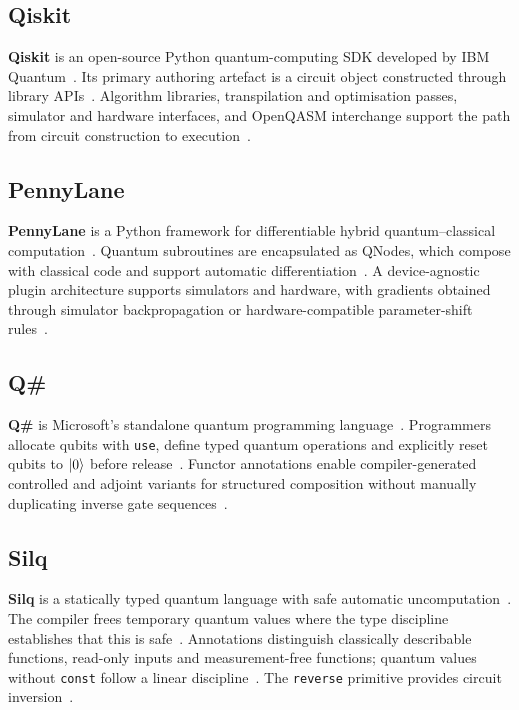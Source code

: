 \subsection{Qiskit}\label{subsec:system_descriptions:qiskit}
\textbf{Qiskit} is an open-source Python quantum-computing SDK developed by IBM Quantum~\cite{aleksandrowicz2019qiskit}.
Its primary authoring artefact is a circuit object constructed through library APIs~\cite{aleksandrowicz2019qiskit}.
Algorithm libraries, transpilation and optimisation passes, simulator and hardware interfaces, and OpenQASM interchange support the path from circuit construction to execution~\cite{aleksandrowicz2019qiskit}.

\subsection{PennyLane}\label{subsec:system_descriptions:pennylane}
\textbf{PennyLane} is a Python framework for differentiable hybrid quantum--classical computation~\cite{bergholm2018pennylane}.
Quantum subroutines are encapsulated as QNodes, which compose with classical code and support automatic differentiation~\cite{bergholm2018pennylane}.
A device-agnostic plugin architecture supports simulators and hardware, with gradients obtained through simulator backpropagation or hardware-compatible parameter-shift rules~\cite{bergholm2018pennylane}.

\subsection{Q\#}\label{subsec:system_descriptions:qsharp}
\textbf{Q\#} is Microsoft's standalone quantum programming language~\cite{MicrosoftQSharpOverview}.
Programmers allocate qubits with \texttt{use}, define typed quantum operations and explicitly reset qubits to $\ket{0}$ before release~\cite{MicrosoftQSharpOverview}.
Functor annotations enable compiler-generated controlled and adjoint variants for structured composition without manually duplicating inverse gate sequences~\cite{MicrosoftQSharpOverview}.

\subsection{Silq}\label{subsec:system_descriptions:silq}
\textbf{Silq} is a statically typed quantum language with safe automatic uncomputation~\cite{bichsel2020silq}.
The compiler frees temporary quantum values where the type discipline establishes that this is safe~\cite{bichsel2020silq}.
Annotations distinguish classically describable functions, read-only inputs and measurement-free functions; quantum values without \texttt{const} follow a linear discipline~\cite{bichsel2020silq}.
The \texttt{reverse} primitive provides circuit inversion~\cite{bichsel2020silq}.

